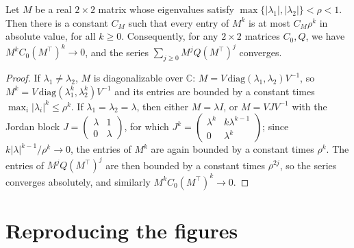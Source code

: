 \begin{lemma}\label{lem:matrix-powers}
Let $M$ be a real $2\times2$ matrix whose eigenvalues satisfy
$\max\{|\lambda_1|,|\lambda_2|\}<\rho<1$. Then there is a constant $C_M$ such that every entry
of $M^k$ is at most $C_M\rho^k$ in absolute value, for all $k\ge0$. Consequently, for any
$2\times2$ matrices $C_0,Q$, we have $M^kC_0(M^\top)^k\to0$, and the series
$\sum_{j\ge0}M^jQ(M^\top)^j$ converges.
\end{lemma}

\begin{proof}
If $\lambda_1\ne\lambda_2$, $M$ is diagonalizable over $\mathbb C$: $M=V\,\mathrm{diag}(\lambda_1,\lambda_2)V^{-1}$,
so $M^k=V\,\mathrm{diag}(\lambda_1^k,\lambda_2^k)V^{-1}$ and its entries are bounded by a constant
times $\max_i|\lambda_i|^k\le\rho^k$. If $\lambda_1=\lambda_2=\lambda$, then either
$M=\lambda I$, or $M=VJV^{-1}$ with the Jordan block $J=\begin{pmatrix}\lambda&1\\0&\lambda\end{pmatrix}$,
for which $J^k=\begin{pmatrix}\lambda^k&k\lambda^{k-1}\\0&\lambda^k\end{pmatrix}$; since
$k|\lambda|^{k-1}/\rho^k\to0$, the entries of $M^k$ are again bounded by a constant times
$\rho^k$. The entries of $M^jQ(M^\top)^j$ are then bounded by a constant times $\rho^{2j}$, so
the series converges absolutely, and similarly $M^kC_0(M^\top)^k\to0$.
\end{proof}

\section{Reproducing the figures}\label{app:reproduce}

